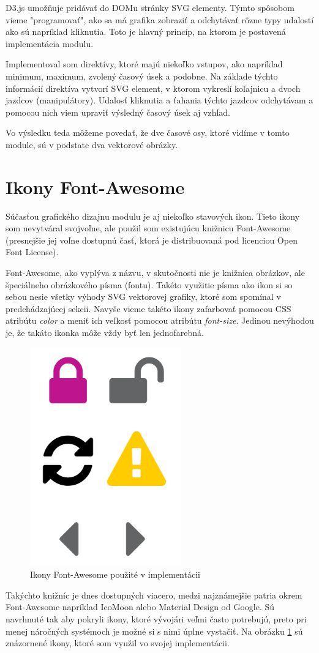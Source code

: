\documentclass[
  digital, %
  twoside, %
  notable,   %
  nolof,   %
  nolot,   %
]{fithesis3}
\newcommand{\inquotes}[1]{{}"{}#1{}"{}}
\begin{document}
D3.js umožňuje pridávať do DOMu stránky SVG elementy. Týmto spôsobom vieme \inquotes{programovať}, ako sa má grafika zobraziť a odchytávať rôzne typy udalostí ako sú napríklad kliknutia. Toto je hlavný princíp, na ktorom je postavená implementácia modulu.

Implementoval som direktívy, ktoré majú niekoľko vstupov, ako napríklad minimum, maximum, zvolený časový úsek a podobne. Na základe týchto informácií direktíva vytvorí SVG element, v ktorom vykreslí koľajnicu a dvoch jazdcov (manipulátory). Udalosť kliknutia a ťahania týchto jazdcov odchytávam a pomocou nich viem upraviť výsledný časový úsek aj vzhľad.

Vo výsledku teda môžeme povedať, že dve časové osy, ktoré vidíme v tomto module, sú v podstate dva vektorové obrázky.

\section{Ikony Font-Awesome}
Súčasťou grafického dizajnu modulu je aj niekoľko stavových ikon. Tieto ikony som nevytváral svojvoľne, ale použil som existujúcu knižnicu Font-Awesome (presnejšie jej voľne dostupnú časť, ktorá je distribuovaná pod licenciou Open Font License).

Font-Awesome, ako vyplýva z názvu, v skutočnosti nie je knižnica obrázkov, ale špeciálneho obrázkového písma (fontu). Takéto využitie písma ako ikon si so sebou nesie všetky výhody SVG vektorovej grafiky, ktoré som spomínal v predchádzajúcej sekcii. Navyše vieme takéto ikony zafarbovať pomocou CSS atribútu \textit{color} a meniť ich veľkosť pomocou atribútu \textit{font-size}. Jedinou nevýhodou je, že takáto ikonka môže vždy byť len jednofarebná.

\begin{figure}
	\center
	\includegraphics[width=.25\linewidth]{icons}
	\caption{Ikony Font-Awesome použité v implementácii}
	\label{icons}
\end{figure}

Takýchto knižníc je dnes dostupných viacero, medzi najznámejšie patria okrem Font-Awesome napríklad IcoMoon alebo Material Design od Google. Sú navrhnuté tak aby pokryli ikony, ktoré vývojári veľmi často potrebujú, preto pri menej náročných systémoch je možné si s nimi úplne vystačiť. Na obrázku \ref{icons} sú znázornené ikony, ktoré som využil vo svojej implementácii.
\end{document}
